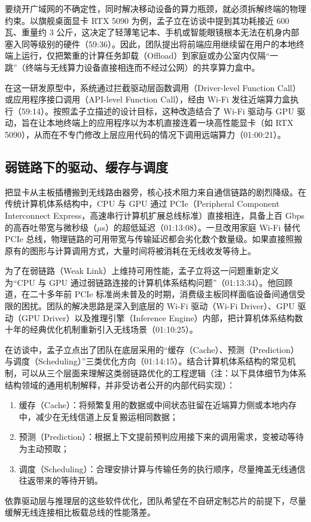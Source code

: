 \documentclass[UTF8,a4paper,11pt,fontset=fandol]{ctexart}
\begin{document}
要绕开广域网的不确定性，同时解决移动设备的算力瓶颈，就必须拆解终端的物理约束。以旗舰桌面显卡 RTX 5090 为例，孟子立在访谈中提到其功耗接近 600 瓦、重量约 3 公斤，这决定了轻薄笔记本、手机或智能眼镜根本无法在机身内部塞入同等级别的硬件（59:36）。因此，团队提出将前端应用继续留在用户的本地终端上运行，仅把繁重的计算任务卸载（Offload）到家庭或办公室内仅隔“一跳”（终端与无线算力设备直接相连而不经过公网）的共享算力盒中。

在这一研发原型中，系统通过拦截驱动层函数调用（Driver-level Function Call）或应用程序接口调用（API-level Function Call），经由 Wi-Fi 发往近端算力盒执行（59:14）。按照孟子立描述的设计目标，这种改造结合了 Wi-Fi 驱动与 GPU 驱动，旨在让本地终端上的应用程序以为本机直接连着一块高性能显卡（如 RTX 5090），从而在不专门修改上层应用代码的情况下调用远端算力（01:00:21）。

\subsection{弱链路下的驱动、缓存与调度}
把显卡从主板插槽搬到无线路由器旁，核心技术阻力来自通信链路的剧烈降级。在传统计算机体系结构中，CPU 与 GPU 通过 PCIe（Peripheral Component Interconnect Express，高速串行计算机扩展总线标准）直接相连，具备上百 Gbps 的高吞吐带宽与微秒级（\(\mu\)s）的超低延迟（01:13:08）。一旦改用家庭 Wi-Fi 替代 PCIe 总线，物理链路的可用带宽与传输延迟都会劣化数个数量级。如果直接照搬原有的图形与计算调用方式，大量时间将被消耗在无线收发等待上。

为了在弱链路（Weak Link）上维持可用性能，孟子立将这一问题重新定义为“CPU 与 GPU 通过弱链路连接的计算机体系结构问题”（01:13:34）。他回顾道，在二十多年前 PCIe 标准尚未普及的时期，消费级主板同样面临设备间通信受限的困扰。团队的解决思路是深入到底层的 Wi-Fi 驱动（Wi-Fi Driver）、GPU 驱动（GPU Driver）以及推理引擎（Inference Engine）内部，把计算机体系结构数十年的经典优化机制重新引入无线场景（01:10:25）。

在访谈中，孟子立点出了团队在底层采用的“缓存（Cache）、预测（Prediction）与调度（Scheduling）”三类优化方向（01:14:15）。结合计算机体系结构的常见机制，可以从三个层面来理解这类弱链路优化的工程逻辑（注：以下具体细节为体系结构领域的通用机制解释，并非受访者公开的内部代码实现）：
\begin{enumerate}
\item 缓存（Cache）：将频繁复用的数据或中间状态驻留在近端算力侧或本地内存中，减少在无线信道上反复搬运相同数据；
\item 预测（Prediction）：根据上下文提前预判应用接下来的调用需求，变被动等待为主动预取；
\item 调度（Scheduling）：合理安排计算与传输任务的执行顺序，尽量掩盖无线通信往返带来的等待开销。
\end{enumerate}
依靠驱动层与推理层的这些软件优化，团队希望在不自研定制芯片的前提下，尽量缓解无线连接相比板载总线的性能落差。
\end{document}
